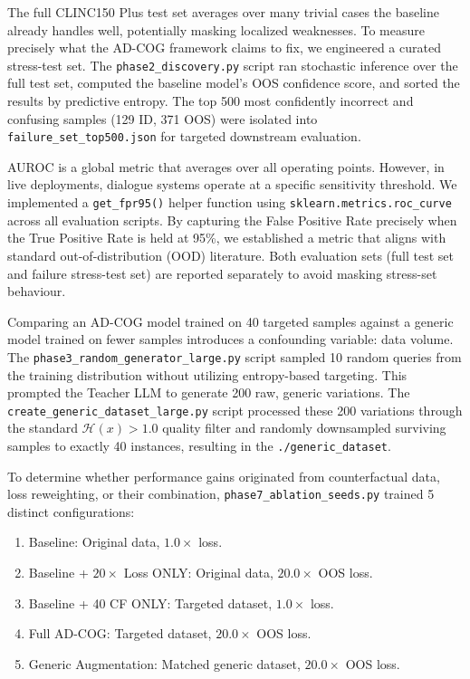 \documentclass[11pt,a4paper]{article}
\begin{document}
\begin{description}[leftmargin=*]
    \item[Step 1: Building the Failure Stress-Test Set.] The full CLINC150 Plus test set averages over many trivial cases the baseline already handles well, potentially masking localized weaknesses. To measure precisely what the AD-COG framework claims to fix, we engineered a curated stress-test set. The \texttt{phase2\_discovery.py} script ran stochastic inference over the full test set, computed the baseline model's OOS confidence score, and sorted the results by predictive entropy. The top 500 most confidently incorrect and confusing samples (129 ID, 371 OOS) were isolated into \texttt{failure\_set\_top500.json} for targeted downstream evaluation.

    \item[Step 2: Integrating the FPR95 Metric.] AUROC is a global metric that averages over all operating points. However, in live deployments, dialogue systems operate at a specific sensitivity threshold. We implemented a \texttt{get\_fpr95()} helper function using \texttt{sklearn.metrics.roc\_curve} across all evaluation scripts. By capturing the False Positive Rate precisely when the True Positive Rate is held at 95\%, we established a metric that aligns with standard out-of-distribution (OOD) literature. Both evaluation sets (full test set and failure stress-test set) are reported separately to avoid masking stress-set behaviour.

    \item[Step 3: Establishing the Matched-$N$ Generic Baseline.] Comparing an AD-COG model trained on 40 targeted samples against a generic model trained on fewer samples introduces a confounding variable: data volume. The \texttt{phase3\_random\_generator\_large.py} script sampled 10 random queries from the training distribution without utilizing entropy-based targeting. This prompted the Teacher LLM to generate 200 raw, generic variations. The \texttt{create\_generic\_dataset\_large.py} script processed these 200 variations through the standard $\mathcal{H}(x) > 1.0$ quality filter and randomly downsampled surviving samples to exactly 40 instances, resulting in the \texttt{./generic\_dataset}.

    \item[Step 4: Structuring the 5-Configuration Ablation Matrix.] To determine whether performance gains originated from counterfactual data, loss reweighting, or their combination, \texttt{phase7\_ablation\_seeds.py} trained 5 distinct configurations:
    \begin{enumerate}
        \item Baseline: Original data, $1.0\times$ loss.
        \item Baseline + $20\times$ Loss ONLY: Original data, $20.0\times$ OOS loss.
        \item Baseline + 40 CF ONLY: Targeted dataset, $1.0\times$ loss.
        \item Full AD-COG: Targeted dataset, $20.0\times$ OOS loss.
        \item Generic Augmentation: Matched generic dataset, $20.0\times$ OOS loss.
    \end{enumerate}


\end{description}
\end{document}
